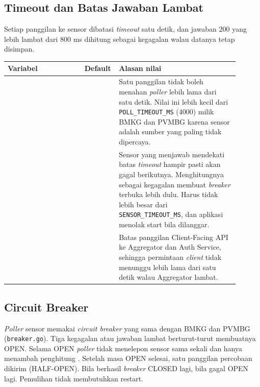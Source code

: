 \newcommand{\envtab}[1]{%
\begin{longtable}[]{|>{\raggedright\arraybackslash}p{0.32\linewidth}|>{\raggedright\arraybackslash}p{0.08\linewidth}|>{\raggedright\arraybackslash}p{0.5\linewidth}|}
\hline
\textbf{Variabel} & \textbf{Default} & \textbf{Alasan nilai} \\
\hline
\endfirsthead
\hline
\endhead
#1
\end{longtable}}

\subsection{Timeout dan Batas Jawaban Lambat}

Setiap panggilan ke sensor dibatasi \textit{timeout} satu detik, dan jawaban 200 yang lebih lambat dari 800 ms dihitung sebagai kegagalan walau datanya tetap disimpan.

\envtab{
\env{SENSOR_TIMEOUT_MS} & 1000 & Satu panggilan tidak boleh menahan \textit{poller} lebih lama dari satu detik. Nilai ini lebih kecil dari \texttt{POLL\_TIMEOUT\_MS} (4000) milik BMKG dan PVMBG karena sensor adalah sumber yang paling tidak dipercaya. \\
\hline
\env{SENSOR_SLOW_MS} & 800 & Sensor yang menjawab mendekati batas \textit{timeout} hampir pasti akan gagal berikutnya. Menghitungnya sebagai kegagalan membuat \textit{breaker} terbuka lebih dulu. Harus tidak lebih besar dari \texttt{SENSOR\_TIMEOUT\_MS}, dan aplikasi menolak start bila dilanggar. \\
\hline
\env{UPSTREAM_TIMEOUT_MS} & 1000 & Batas panggilan Client-Facing API ke Aggregator dan Auth Service, sehingga permintaan \textit{client} tidak menunggu lebih lama dari satu detik walau Aggregator lambat. \\
\hline
}

\subsection{Circuit Breaker}

\textit{Poller} sensor memakai \textit{circuit breaker} yang sama dengan BMKG dan PVMBG (\texttt{breaker.go}). Tiga kegagalan atau jawaban lambat berturut-turut membuatnya OPEN. Selama OPEN \textit{poller} tidak menelepon sensor sama sekali dan hanya menambah penghitung . Setelah masa OPEN selesai, satu panggilan percobaan dikirim (HALF-OPEN). Bila berhasil \textit{breaker} CLOSED lagi, bila gagal OPEN lagi. Pemulihan tidak membutuhkan restart.

